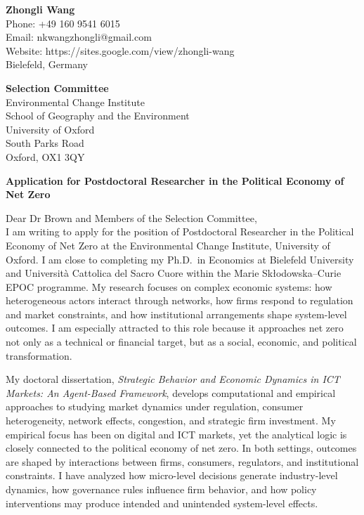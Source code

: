 \documentclass[11pt]{article}
\begin{document}
\begin{flushright}
\textbf{Zhongli Wang} \\
Phone: +49 160 9541 6015 \\
Email: nkwangzhongli@gmail.com \\
Website: https://sites.google.com/view/zhongli-wang \\
Bielefeld, Germany \\
\end{flushright}

\vspace{0.25cm}

\noindent
\textbf{Selection Committee} \\
Environmental Change Institute \\
School of Geography and the Environment \\
University of Oxford \\
South Parks Road \\
Oxford, OX1 3QY \\

\vspace{0.25cm}

\noindent
\textbf{Application for Postdoctoral Researcher in the Political Economy of Net Zero}\\

\vspace{0.15cm}

\noindent Dear Dr Brown and Members of the Selection Committee,\\[0.1cm]

I am writing to apply for the position of Postdoctoral Researcher in the Political Economy of Net Zero at the Environmental Change Institute, University of Oxford. I am close to completing my Ph.D.\ in Economics at Bielefeld University and Universit\`a Cattolica del Sacro Cuore within the Marie Sk{\l}odowska--Curie EPOC programme. My research focuses on complex economic systems: how heterogeneous actors interact through networks, how firms respond to regulation and market constraints, and how institutional arrangements shape system-level outcomes. I am especially attracted to this role because it approaches net zero not only as a technical or financial target, but as a social, economic, and political transformation.

My doctoral dissertation, \emph{Strategic Behavior and Economic Dynamics in ICT Markets: An Agent-Based Framework}, develops computational and empirical approaches to studying market dynamics under regulation, consumer heterogeneity, network effects, congestion, and strategic firm investment. My empirical focus has been on digital and ICT markets, yet the analytical logic is closely connected to the political economy of net zero. In both settings, outcomes are shaped by interactions between firms, consumers, regulators, and institutional constraints. I have analyzed how micro-level decisions generate industry-level dynamics, how governance rules influence firm behavior, and how policy interventions may produce intended and unintended system-level effects.
\end{document}
